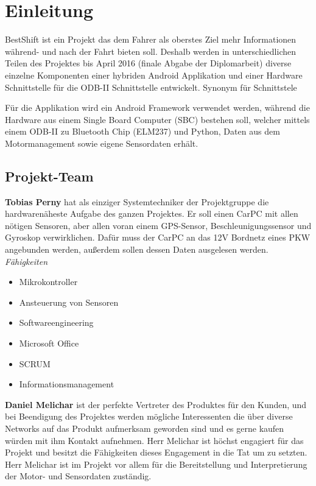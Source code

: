 \chapter{Einleitung}
BestShift ist ein Projekt das dem Fahrer als oberstes Ziel mehr Informationen während- und nach der Fahrt bieten soll. Deshalb werden in unterschiedlichen Teilen des Projektes bis April 2016 (finale Abgabe der Diplomarbeit) diverse einzelne Komponenten einer hybriden Android Applikation und einer Hardware Schnittstelle für die ODB-II Schnittstelle entwickelt. 
\todo Synonym für Schnittstele

Für die Applikation wird ein Android Framework verwendet werden, während die Hardware aus einem Single Board Computer (SBC) bestehen soll, welcher mittels einem ODB-II zu Bluetooth Chip (ELM237) und Python, Daten aus dem Motormanagement sowie eigene Sensordaten erhält. 

\section{Projekt-Team}
\textbf{Tobias Perny} hat als einziger Systemtechniker der Projektgruppe die hardwarenäheste Aufgabe des ganzen Projektes. Er soll einen CarPC mit allen nötigen Sensoren, aber allen voran einem GPS-Sensor, Beschleunigungssensor und Gyroskop verwirklichen. Dafür muss der CarPC an das 12V Bordnetz eines PKW angebunden werden, außerdem sollen dessen Daten ausgelesen werden.
\nextline 
\textit{Fähigkeiten}
\begin{itemize}
	\item Mikrokontroller
	\item Ansteuerung von Sensoren		
	\item Softwareengineering
	\item Microsoft Office
	\item SCRUM
	\item Informationsmanagement
\end{itemize}

\textbf{Daniel Melichar} ist der perfekte Vertreter des Produktes für den Kunden, und bei Beendigung des Projektes werden mögliche Interessenten die über diverse Networks auf das Produkt aufmerksam geworden sind und es gerne kaufen würden mit ihm Kontakt aufnehmen. Herr Melichar ist höchst engagiert für das Projekt und besitzt die Fähigkeiten dieses Engagement in die Tat um zu setzten. Herr Melichar ist im Projekt vor allem für die Bereitstellung und Interpretierung der Motor- und Sensordaten zuständig. 

